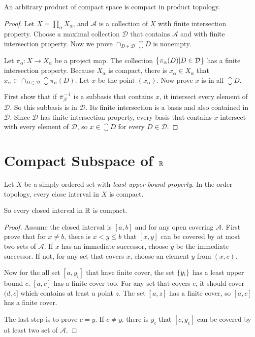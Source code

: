 \begin{theorem}
    An arbitrary product of compact space is compact in product topology.    
\end{theorem}
\begin{proof}
    Let $X = \prod_{\alpha} X_\alpha$, and $\mathcal{A}$ is a collection of $X$ with finite intersection property. Choose a maximal collection $\mathcal{D}$ that contains $\mathcal{A}$ and with finite intersection property. Now we prove $\cap_{D \in \mathcal{D}} \closure{D}$ is nonempty.
    
    Let $\pi_\alpha: X \rightarrow X_\alpha$ be a project map. The collection $\set{\pi_\alpha(D)| D \in \mathcal{D}}$ has a finite intersection property. Because $X_\alpha$ is compact, there is $x_\alpha \in X_\alpha$ that $x_\alpha \in \cap_{D \in \mathcal{D}} \closure{\pi_\alpha(D)}$. Let $x$ be the point $(x_\alpha)$. Now prove $x$ is in all $\closure{D}$.
    
    
    First show that if ${\pi}^{-1}_\beta$ is a subbasis that contains $x$, it intersect every element of $\mathcal{D}$. So this subbasis is in $\mathcal{D}$. Its finite intersection is a basis and also contained in $\mathcal{D}$. Since $\mathcal{D}$ has finite intersection property, every basis that contains $x$ intersect with every element of $\mathcal{D}$, so $x \in \closure{D}$ for every $D \in \mathcal{D}$.
\end{proof}




\section{Compact Subspace of $\mathbb{R}$}

\begin{theorem}
    Let $X$ be a simply ordered set with \emph{least upper bound property}. In the order topology, every close interval in $X$ is compact. 
    
    So every closed interval in $\mathbb{R}$ is compact.
\end{theorem}
\begin{proof}
    Assume the closed interval is $[a,b]$ and for any open covering $\mathcal{A}$. First prove that for $x \neq b$, there is $x < y \leq b$ that $[x,y]$ can be covered by at most two sets of $\mathcal{A}$. If $x$ has an immediate successor, choose $y$ be the immediate successor. If not, for any set that covers $x$, choose an element $y$ from $(x,c)$.
    
    Now for the all set $[a,y_i]$ that have finite cover, the set $\set{y_i}$ has a least upper bound $c$. $[a,c]$ has a finite cover too. For any set that covers $c$, it should cover $(d,c]$ which contains at least a point $z$. The set $[a,z]$ has a finite cover, so $[a,c]$ has a finite cover.
    
    The last step is to prove $c = y$. If $c \neq y$, there is $y_c$ that $[c, y_c]$ can be covered by at least two set of $\mathcal{A}$.
\end{proof}

